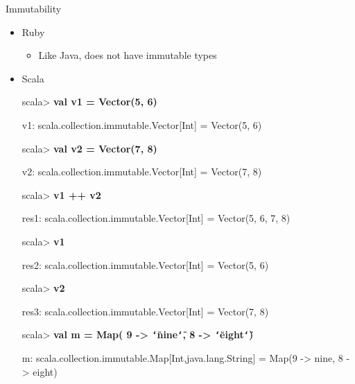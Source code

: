 \documentclass{beamer}
\renewcommand{\textquotedbl}{\texttt{\char`\"}}
\begin{document}
\begin{frame}[allowframebreaks]{Immutability}
\begin{itemize}
    \framebreak
  \item Ruby
    \begin{itemize}
    \item Like Java, does not have immutable types
    \end{itemize}
  \item Scala\\
\begin{small}
{\ttfamily\color{black}
%
\textcolor[rgb]{0.0,0.0,0.8039216}{scala{\textgreater} }\textbf{val v1 =
Vector(5, 6)}}

{\ttfamily\color[rgb]{0.54509807,0.13333334,0.32156864}
v1: scala.collection.immutable.Vector[Int] = Vector(5, 6)}


\bigskip

{\ttfamily\color{black}
\textcolor[rgb]{0.0,0.0,0.8039216}{scala{\textgreater} }\textbf{val v2 =
Vector(7, 8)}}

{\ttfamily\color[rgb]{0.54509807,0.13333334,0.32156864}
v2: scala.collection.immutable.Vector[Int] = Vector(7, 8)}


\bigskip

{\ttfamily\color{black}
\textcolor[rgb]{0.0,0.0,0.8039216}{scala{\textgreater} }\textbf{v1 ++
v2}}

{\ttfamily\color[rgb]{0.54509807,0.13333334,0.32156864}
res1: scala.collection.immutable.Vector[Int] = Vector(5, 6, 7, 8)}


\bigskip

{\ttfamily\color{black}
\textcolor[rgb]{0.0,0.0,0.8039216}{scala{\textgreater} }\textbf{v1}}

{\ttfamily\color[rgb]{0.54509807,0.13333334,0.32156864}
res2: scala.collection.immutable.Vector[Int] = Vector(5, 6)}


\bigskip

{\ttfamily\color{black}
\textcolor[rgb]{0.0,0.0,0.8039216}{scala{\textgreater} }\textbf{v2}}

{\ttfamily\color[rgb]{0.54509807,0.13333334,0.32156864}
res3: scala.collection.immutable.Vector[Int] = Vector(7, 8)}


\bigskip

{\ttfamily\color{black}
\textcolor[rgb]{0.0,0.0,0.8039216}{scala{\textgreater} }\textbf{val m =
Map( 9 -{\textgreater} {\textquotedbl}nine{\textquotedbl}, 8
-{\textgreater} {\textquotedbl}eight{\textquotedbl})}}

{\ttfamily\color{black}
m: scala.collection.immutable.Map[Int,java.lang.String] = Map(9
\textcolor[rgb]{0.69803923,0.13333334,0.13333334}{{}-{\textgreater}}
nine, 8
\textcolor[rgb]{0.69803923,0.13333334,0.13333334}{{}-{\textgreater}}
eight)}



\end{small}
\end{itemize}
\end{frame}
\end{document}
